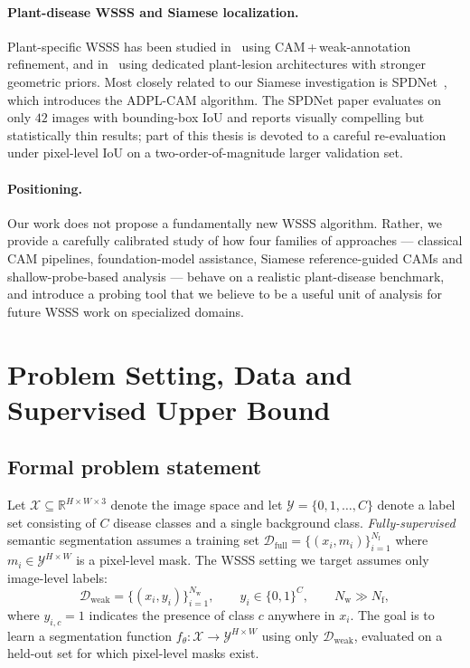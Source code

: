 \documentclass[11pt,a4paper]{article}
\begin{document}
\paragraph{Plant-disease WSSS and Siamese localization.}
Plant-specific WSSS has been studied in~\citep{plant_wsss} using
CAM\,+\,weak-annotation refinement, and in~\citep{garden,sparsemoesam}
using dedicated plant-lesion architectures with stronger geometric
priors. Most closely related to our Siamese investigation is
SPDNet~\citep{spdnet}, which introduces the ADPL-CAM algorithm. The
SPDNet paper evaluates on only $42$ images with bounding-box IoU and
reports visually compelling but statistically thin results; part of
this thesis is devoted to a careful re-evaluation under pixel-level
IoU on a two-order-of-magnitude larger validation set.

\paragraph{Positioning.}
Our work does not propose a fundamentally new WSSS algorithm. Rather,
we provide a carefully calibrated study of how four families of
approaches — classical CAM pipelines, foundation-model assistance,
Siamese reference-guided CAMs and shallow-probe-based analysis — behave
on a realistic plant-disease benchmark, and introduce a probing tool
that we believe to be a useful unit of analysis for future WSSS work on
specialized domains.

\section{Problem Setting, Data and Supervised Upper Bound}
\label{sec:setup}

\subsection{Formal problem statement}

Let $\mathcal{X}\subseteq\mathbb{R}^{H\times W\times 3}$ denote the
image space and let $\mathcal{Y}=\{0,1,\dots,C\}$ denote a label set
consisting of $C$ disease classes and a single background class.
\emph{Fully-supervised} semantic segmentation assumes a training set
$\mathcal{D}_{\mathrm{full}}=\{(x_i,m_i)\}_{i=1}^{N_{\mathrm{f}}}$
where $m_i\in\mathcal{Y}^{H\times W}$ is a pixel-level mask. The WSSS
setting we target assumes only image-level labels:
\[
  \mathcal{D}_{\mathrm{weak}}=\{(x_i,y_i)\}_{i=1}^{N_{\mathrm{w}}},
  \qquad
  y_i\in\{0,1\}^{C},
  \qquad N_{\mathrm{w}}\gg N_{\mathrm{f}},
\]
where $y_{i,c}=1$ indicates the presence of class $c$ anywhere in $x_i$.
The goal is to learn a segmentation function
$f_\theta:\mathcal{X}\to\mathcal{Y}^{H\times W}$ using only
$\mathcal{D}_{\mathrm{weak}}$, evaluated on a held-out set for which
pixel-level masks exist.
\end{document}
